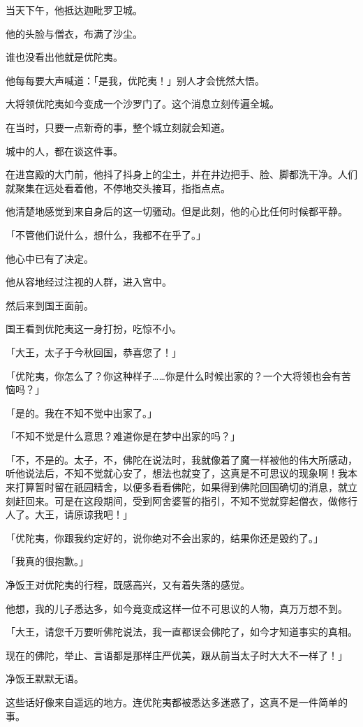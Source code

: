 \documentclass[twoside,openany]{book}
\begin{document}
当天下午，他抵达迦毗罗卫城。

他的头脸与僧衣，布满了沙尘。

谁也没看出他就是优陀夷。

他每每要大声喊道：「是我，优陀夷！」别人才会恍然大悟。

大将领优陀夷如今变成一个沙罗门了。这个消息立刻传遍全城。

在当时，只要一点新奇的事，整个城立刻就会知道。

城中的人，都在谈这件事。

在进宫殿的大门前，他抖了抖身上的尘土，并在井边把手、脸、脚都洗干净。人们就聚集在远处看着他，不停地交头接耳，指指点点。

他清楚地感觉到来自身后的这一切骚动。但是此刻，他的心比任何时候都平静。

「不管他们说什么，想什么，我都不在乎了。」

他心中已有了决定。

他从容地经过注视的人群，进入宫中。

然后来到国王面前。

国王看到优陀夷这一身打扮，吃惊不小。

「大王，太子于今秋回国，恭喜您了！」

「优陀夷，你怎么了？你这种样子……你是什么时候出家的？一个大将领也会有苦恼吗？」

「是的。我在不知不觉中出家了。」

「不知不觉是什么意思？难道你是在梦中出家的吗？」

「不，不是的。太子，不，佛陀在说法时，我就像着了魔一样被他的伟大所感动，听他说法后，不知不觉就心安了，想法也就变了，这真是不可思议的现象啊！我本来打算暂时留在祇园精舍，以便多看看佛陀，如果得到佛陀回国确切的消息，就立刻赶回来。可是在这段期间，受到阿舍婆誓的指引，不知不觉就穿起僧衣，做修行人了。大王，请原谅我吧！」

「优陀夷，你跟我约定好的，说你绝对不会出家的，结果你还是毁约了。」

「我真的很抱歉。」

净饭王对优陀夷的行程，既感高兴，又有着失落的感觉。

他想，我的儿子悉达多，如今竟变成这样一位不可思议的人物，真万万想不到。

「大王，请您千万要听佛陀说法，我一直都误会佛陀了，如今才知道事实的真相。

现在的佛陀，举止、言语都是那样庄严优美，跟从前当太子时大大不一样了！」

净饭王默默无语。

这些话好像来自遥远的地方。连优陀夷都被悉达多迷惑了，这真不是一件简单的事。
\end{document}
